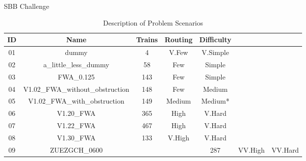 \documentclass[aspectratio=169]{beamer}
\begin{document}
\begin{frame}{SBB Challenge}
    \begin{table}
        \small
        \centering
        \begin{tabular}{|c|c|cc|c|cc|}
            \hline
            ID & Name & Trains & Routing & Difficulty \\
            \hline
            01 & dummy & 4 & V.Few & V.Simple \\
            02 & a\_little\_less\_dummy & 58 & Few & Simple \\
            03 & FWA\_0.125 & 143 & Few & Simple \\
            04 & V1.02\_FWA\_without\_obstruction & 148 & Few & Medium \\
            05 & V1.02\_FWA\_with\_obstruction & 149 & Medium & Medium*\\
            06 & V1.20\_FWA & 365 & High & V.Hard \\
            07 & V1.22\_FWA & 467 & High & V.Hard \\
            08 & V1.30\_FWA & 133 & V.High & V.Hard \\
            09 & ZUE\-ZG\-CH\_0600\-1200& & & 287 & VV.High & VV.Hard \\
            \hline
        \end{tabular}
        \caption{Description of Problem Scenarios}
        \label{tab:all-scenarios}
    \end{table}
\end{frame}
\end{document}
